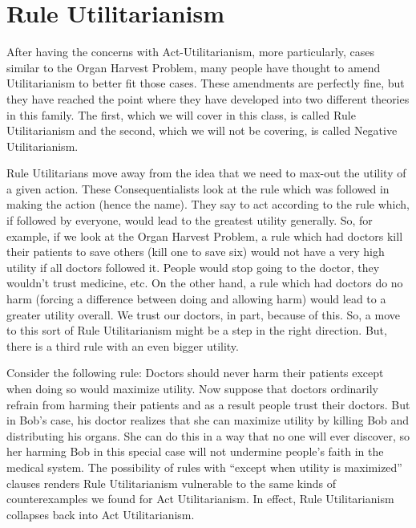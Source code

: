 \section{Rule Utilitarianism}

After having the concerns with Act-Utilitarianism, more particularly, cases similar to the Organ Harvest Problem, many people have thought to amend Utilitarianism to better fit those cases. These amendments are perfectly fine, but they have reached the point where they have developed into two different theories in this family. The first, which we will cover in this class, is called Rule Utilitarianism and the second, which we will not be covering, is called Negative Utilitarianism.

Rule Utilitarians move away from the idea that we need to max-out the utility of a given action. These Consequentialists look at the rule which was followed in making the action (hence the name). They say to act according to the rule which, if followed by everyone, would lead to the greatest utility generally. So, for example, if we look at the Organ Harvest Problem, a rule which had doctors kill their patients to save others (kill one to save six) would not have a very high utility if all doctors followed it. People would stop going to the doctor, they wouldn't trust medicine, etc. On the other hand, a rule which had doctors do no harm (forcing a difference between doing and allowing harm) would lead to a greater utility overall. We trust our doctors, in part, because of this. So, a move to this sort of Rule Utilitarianism might be a step in the right direction. But, there is a third rule with an even bigger utility.

Consider the following rule: Doctors should never harm their patients except when doing so would maximize utility. Now suppose that doctors ordinarily refrain from harming their patients and as a result people trust their doctors. But in Bob’s case, his doctor realizes that she can maximize utility by killing Bob and distributing his organs. She can do this in a way that no one will ever discover, so her harming Bob in this special case will not undermine people’s faith in the medical system. The possibility of rules with “except when utility is maximized” clauses renders Rule Utilitarianism vulnerable to the same kinds of counterexamples we found for Act Utilitarianism. In effect, Rule Utilitarianism collapses back into Act Utilitarianism.

